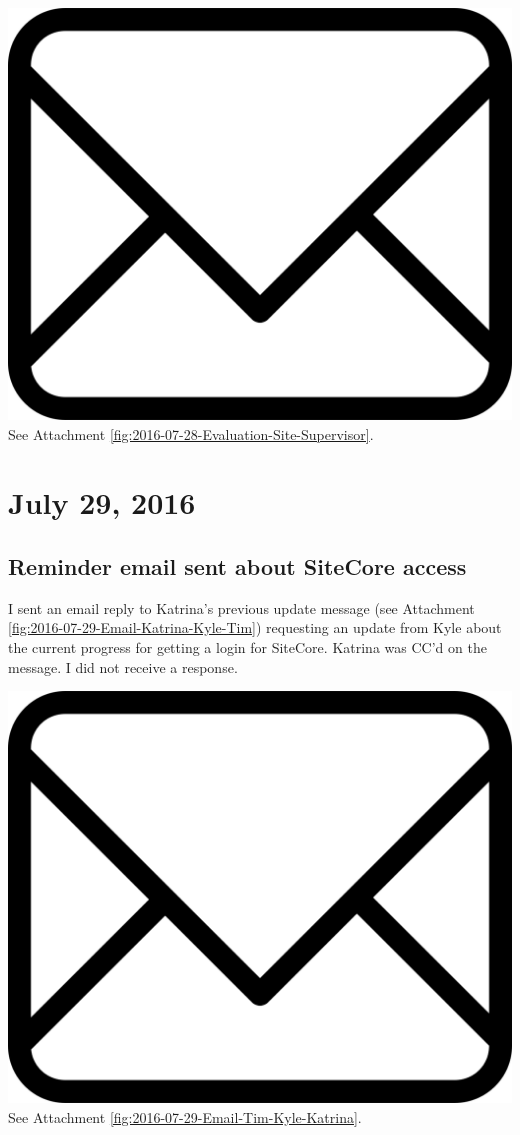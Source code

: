 \documentclass{article}
\begin{document}
\vspace{2em}
\noindent\includegraphics[height=\fontcharht\font`\B]{icons/attachment-email} See Attachment \ref{fig:2016-07-28-Evaluation-Site-Supervisor}.
\vspace{2em}

\section{July 29, 2016}
\subsection{Reminder email sent about SiteCore access}
I sent an email reply to Katrina's previous update message (see Attachment \ref{fig:2016-07-29-Email-Katrina-Kyle-Tim}) requesting an update from Kyle about the current progress for getting a login for SiteCore. Katrina was CC'd on the message. I did not receive a response.

\vspace{2em}
\noindent\includegraphics[height=\fontcharht\font`\B]{icons/attachment-email} See Attachment \ref{fig:2016-07-29-Email-Tim-Kyle-Katrina}.
\vspace{2em}
\end{document}
